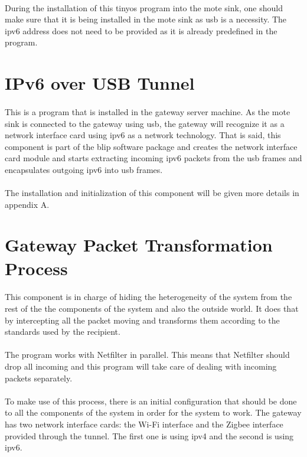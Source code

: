 \documentclass[oneside,12pt,a4paper,final]{book}
\begin{document}
\paragraph{}
During the installation of this \gls{tinyos} program into the mote sink, one should make sure that it is being installed in the mote sink as \gls{usb} is a necessity. The \gls{ipv6} address does not need to be provided as it is already predefined in the program.

\section{IPv6 over USB Tunnel}
\paragraph{}
This is a program that is installed in the gateway server machine. As the mote sink is connected to the gateway using \gls{usb}, the gateway will recognize it as a network interface card using \gls{ipv6} as a network technology. That is said, this component is part of the \gls{blip} software package and creates the network interface card module and starts extracting incoming \gls{ipv6} packets from the \gls{usb} frames and encapsulates outgoing \gls{ipv6} into \gls{usb} frames.
\paragraph{}
The installation and initialization of this component will be given more details in appendix A.
\section{Gateway Packet Transformation Process}
\paragraph{}
This component is in charge of hiding the heterogeneity of the system from the rest of the the components of the system and also the outside world. It does that by intercepting all the packet moving and transforms them according to the standards used by the recipient.
\paragraph{}
The program works with Netfilter in parallel. This means that Netfilter should drop all incoming and this program will take care of dealing with incoming packets separately. 
\paragraph{}
To make use of this process, there is an initial configuration that should be done to all the components of the system in order for the system to work. The gateway has two network interface cards: the Wi-Fi interface and the Zigbee interface provided through the tunnel. The first one is using \gls{ipv4} and the second is using \gls{ipv6}.
\end{document}
